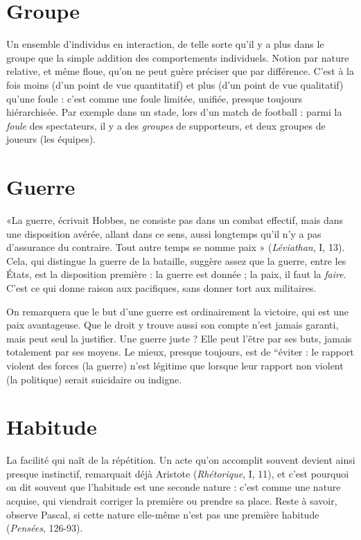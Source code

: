 \section{Groupe}
Un ensemble d'individus en interaction, de telle sorte qu'il y a
plus dans le groupe que la simple addition des comportements
individuels. Notion par nature relative, et même floue, qu’on ne peut guère
préciser que par différence. C’est à la fois moins (d’un point de vue quantitatif)
et plus (d’un point de vue qualitatif) qu’une foule : c’est comme une foule
limitée, unifiée, presque toujours hiérarchisée. Par exemple dans un stade, lors
d’un match de football : parmi la {\it foule} des spectateurs, il y a des {\it groupes} de supporteurs,
et deux groupes de joueurs (les équipes).

\section{Guerre}
«La guerre, écrivait Hobbes, ne consiste pas dans un combat
effectif, mais dans une disposition avérée, allant dans ce sens,
aussi longtemps qu’il n’y a pas d’assurance du contraire. Tout autre temps se
nomme paix » ({\it Léviathan}, I, 13). Cela, qui distingue la guerre de la bataille,
suggère assez que la guerre, entre les États, est la disposition première : la guerre
est donnée ; la paix, il faut la {\it faire}. C’est ce qui donne raison aux pacifiques,
sans donner tort aux militaires.

On remarquera que le but d’une guerre est ordinairement la victoire, qui
est une paix avantageuse. Que le droit y trouve aussi son compte n’est jamais
garanti, mais peut seul la justifier. Une guerre juste ? Elle peut l’être par ses
buts, jamais totalement par ses moyens. Le mieux, presque toujours, est de
“éviter : le rapport violent des forces (la guerre) n’est légitime que lorsque leur
rapport non violent (la politique) serait suicidaire ou indigne.

\section{Habitude}
La facilité qui naît de la répétition. Un acte qu’on accomplit
souvent devient ainsi presque instinctif, remarquait déjà Aristote
({\it Rhétorique}, I, 11), et c’est pourquoi on dit souvent que l’habitude est une
seconde nature : c’est comme une nature acquise, qui viendrait corriger la première
ou prendre sa place. Reste à savoir, observe Pascal, si cette nature elle-même
n’est pas une première habitude ({\it Pensées}, 126-93).


